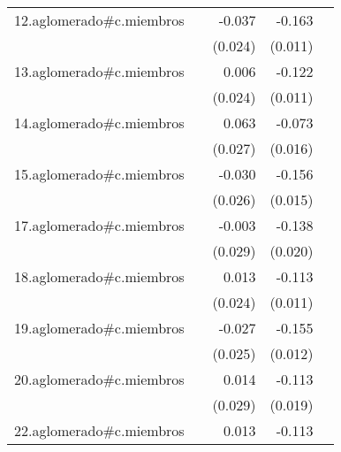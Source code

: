 {\begin{longtable}{l*{4}{D{.}{.}{-1}}}
\addlinespace
12.aglomerado#c.miembros&                     &      -0.037         &      -0.163\sym{***}&                     \\
            &                     &     (0.024)         &     (0.011)         &                     \\
\addlinespace
13.aglomerado#c.miembros&                     &       0.006         &      -0.122\sym{***}&                     \\
            &                     &     (0.024)         &     (0.011)         &                     \\
\addlinespace
14.aglomerado#c.miembros&                     &       0.063\sym{*}  &      -0.073\sym{***}&                     \\
            &                     &     (0.027)         &     (0.016)         &                     \\
\addlinespace
15.aglomerado#c.miembros&                     &      -0.030         &      -0.156\sym{***}&                     \\
            &                     &     (0.026)         &     (0.015)         &                     \\
\addlinespace
17.aglomerado#c.miembros&                     &      -0.003         &      -0.138\sym{***}&                     \\
            &                     &     (0.029)         &     (0.020)         &                     \\
\addlinespace
18.aglomerado#c.miembros&                     &       0.013         &      -0.113\sym{***}&                     \\
            &                     &     (0.024)         &     (0.011)         &                     \\
\addlinespace
19.aglomerado#c.miembros&                     &      -0.027         &      -0.155\sym{***}&                     \\
            &                     &     (0.025)         &     (0.012)         &                     \\
\addlinespace
20.aglomerado#c.miembros&                     &       0.014         &      -0.113\sym{***}&                     \\
            &                     &     (0.029)         &     (0.019)         &                     \\
\addlinespace
22.aglomerado#c.miembros&                     &       0.013         &      -0.113\sym{***}&                     \\

\end{longtable}}
